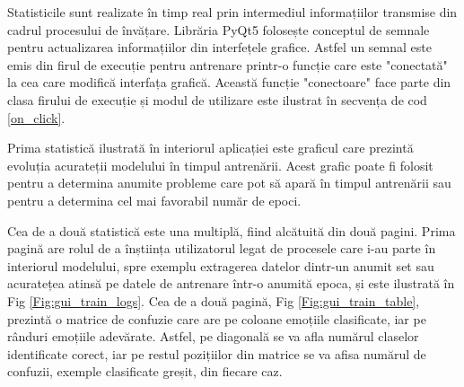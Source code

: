 \documentclass[a4paper,12pt]{book}
\begin{document}
		Statisticile sunt realizate în timp real prin intermediul informațiilor transmise din cadrul procesului de învățare. Librăria PyQt5 folosește conceptul de semnale pentru actualizarea informațiilor din interfețele grafice. Astfel un semnal este emis din firul de execuție pentru antrenare printr-o funcție care este "conectată" la cea care modifică interfața grafică. Această funcție "conectoare" face parte din clasa firului de execuție și modul de utilizare este ilustrat în secvența de cod \ref{on_click}. \par
		Prima statistică ilustrată în interiorul aplicației este graficul care prezintă evoluția acurateții modelului în timpul antrenării. Acest grafic poate fi folosit pentru a determina anumite probleme care pot să apară în timpul antrenării sau pentru a determina cel mai favorabil număr de epoci. \par
		Cea de a două statistică este una multiplă, fiind alcătuită din două pagini. Prima pagină are rolul de a înștiința utilizatorul legat de procesele care i-au parte în interiorul modelului, spre exemplu extragerea datelor dintr-un anumit set sau acuratețea atinsă pe datele de antrenare într-o anumită epoca, și este ilustrată în Fig \ref{Fig:gui_train_logs}. Cea de a două pagină, Fig \ref{Fig:gui_train_table}, prezintă o matrice de confuzie care are pe coloane emoțiile clasificate, iar pe rânduri emoțiile adevărate. Astfel, pe diagonală se va afla numărul claselor identificate corect, iar pe restul pozițiilor din matrice se va afisa numărul de confuzii, exemple clasificate greșit, din fiecare caz. 
\end{document}
